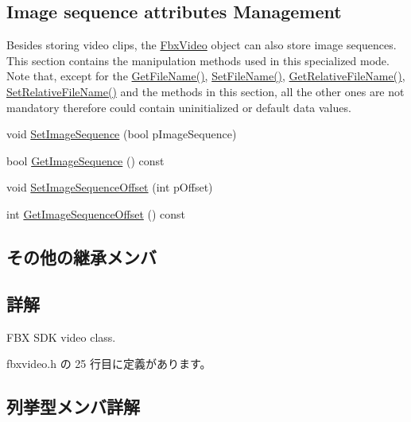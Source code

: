 \subsection*{Image sequence attributes Management}
\label{_amgrp3cc586aa3ad85d11fb9e89277ee745d9}%
Besides storing video clips, the \hyperlink{class_fbx_video}{Fbx\+Video} object can also store image sequences. This section contains the manipulation methods used in this specialized mode. Note that, except for the \hyperlink{class_fbx_video_a96fc2a11e4e7ca89230389bb55ca5466}{Get\+File\+Name()}, \hyperlink{class_fbx_video_a897a450c62670d4730cb9ee663a26ea2}{Set\+File\+Name()}, \hyperlink{class_fbx_video_a5c99c225a47e6aae4cd3028f2737babb}{Get\+Relative\+File\+Name()}, \hyperlink{class_fbx_video_a3217bac3585954766fa2c56a10de48f3}{Set\+Relative\+File\+Name()} and the methods in this section, all the other ones are not mandatory therefore could contain uninitialized or default data values. \begin{DoxyCompactItemize}
\item 
void \hyperlink{class_fbx_video_a511c7cfc220c659c6d07cb4b891572ae}{Set\+Image\+Sequence} (bool p\+Image\+Sequence)
\item 
bool \hyperlink{class_fbx_video_aefb54b6ccb813ae4da9062b27db5fb1f}{Get\+Image\+Sequence} () const
\item 
void \hyperlink{class_fbx_video_a32c2bbbd3fdcfc4d653e14067d92e552}{Set\+Image\+Sequence\+Offset} (int p\+Offset)
\item 
int \hyperlink{class_fbx_video_a9b37e1a2972b4cf0016ad94d86ea5680}{Get\+Image\+Sequence\+Offset} () const
\end{DoxyCompactItemize}
\subsection*{その他の継承メンバ}


\subsection{詳解}
F\+BX S\+DK video class. 

 fbxvideo.\+h の 25 行目に定義があります。



\subsection{列挙型メンバ詳解}
\mbox{\label{class_fbx_video_a6dd88dabb2170adcd8c58952ed2e0c40}} 
